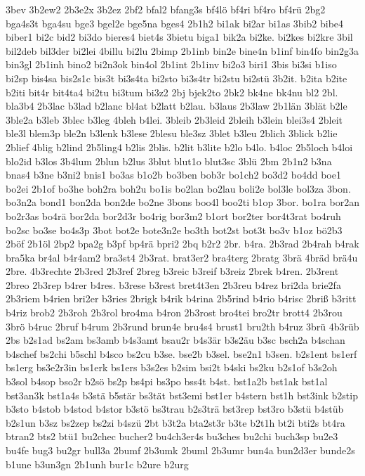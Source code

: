 {3bev
3b2ew2
2b3e2x
3b2ez
2bf2
bfal2
bfang3s
bf4lö
bf4ri
bf4ro
bf4rü
2bg2
bga4s3t
bga4su
bge3
bgel2e
bge5na
bges4
2b1h2
bi1ak
bi2ar
bi1as
3bib2
bibe4
biber1
bi2c
bid2
bi3do
bieres4
biet4s
3bietu
biga1
bik2a
bi2ke.
bi2kes
bi2kre
3bil
bil2deb
bil3der
bi2lei
4billu
bi2lu
2bimp
2b1inb
bin2e
bine4n
b1inf
bin4fo
bin2g3a
bin3gl
2b1inh
bino2
bi2n3ok
bin4ol
2b1int
2b1inv
bi2o3
biri1
3bis
bi3si
b1iso
bi2sp
bis4sa
bis2s1c
bis3t
bi3s4ta
bi2sto
bi3s4tr
bi2stu
bi2stü
3b2it.
b2ita
b2ite
b2iti
bit4r
bit4ta4
bi2tu
bi3tum
bi3z2
2bj
bjek2to
2bk2
bk4ne
bk4nu
bl2
2bl.
bla3b4
2b3lac
b3lad
b2lanc
bl4at
b2latt
b2lau.
b3laus
2b3law
2b1län
3blät
b2le
3ble2a
b3leb
3blec
b3leg
4bleh
b4lei.
3bleib
2b3leid
2bleih
b3lein
blei3s4
2bleit
ble3l
blem3p
ble2n
b3lenk
b3lese
2blesu
ble3sz
3blet
b3leu
2blich
3blick
b2lie
2blief
4blig
b2lind
2b5ling4
b2lis
2blis.
b2lit
b3lite
b2lo
b4lo.
b4loc
2b5loch
b4loi
blo2id
b3los
3b4lum
2blun
b2lus
3blut
blut1o
blut3sc
3blü
2bm
2b1n2
b3na
bnas4
b3ne
b3ni2
bnis1
bo3as
b1o2b
bo3ben
bob3r
bo1ch2
bo3d2
bo4dd
boe1
bo2ei
2b1of
bo3he
boh2ra
boh2u
bo1is
bo2lan
bo2lau
boli2e
bol3le
bol3za
3bon.
bo3n2a
bond1
bon2da
bon2de
bo2ne
3bons
boo4l
boo2ti
b1op
3bor.
bo1ra
bor2an
bo2r3as
bo4rä
bor2da
bor2d3r
bo4rig
bor3m2
b1ort
bor2ter
bor4t3rat
bo4ruh
bo2sc
bo3se
bo4s3p
3bot
bot2e
bote3n2e
bo3th
bot2st
bot3t
bo3v
b1oz
bö2b3
2böf
2b1öl
2bp2
bpa2g
b3pf
bp4rä
bpri2
2bq
b2r2
2br.
b4ra.
2b3rad
2b4rah
b4rak
bra5ka
br4al
b4r4am2
bra3st4
2b3rat.
brat3er2
bra4terg
2bratg
3brä
4bräd
brä4u
2bre.
4b3rechte
2b3red
2b3ref
2breg
b3reic
b3reif
b3reiz
2brek
b4ren.
2b3rent
2breo
2b3rep
b4rer
b4res.
b3rese
b3rest
bret4t3en
2b3reu
b4rez
bri2da
brie2fa
2b3riem
b4rien
bri2er
b3ries
2brigk
b4rik
b4rina
2b5rind
b4rio
b4risc
2briß
b3ritt
b4riz
brob2
2b3roh
2b3rol
bro4ma
b4ron
2b3rost
bro4tei
bro2tr
brott4
2b3rou
3brö
b4ruc
2bruf
b4rum
2b3rund
brun4e
bru4s4
brust1
bru2th
b4ruz
3brü
4b3rüb
2bs
b2s1ad
bs2am
bs3amb
b4s3amt
bsau2r
b4s3är
b3s2äu
b3sc
bsch2a
b4schan
b4schef
bs2chi
b5schl
b4sco
bs2cu
b3se.
bse2b
b3sel.
bse2n1
b3sen.
b2s1ent
bs1erf
bs1erg
bs3e2r3in
bs1erk
bs1ers
b3s2es
b2sim
bsi2t
b4ski
bs2ku
b2s1of
b3s2oh
b3sol
b4sop
bso2r
b2sö
bs2p
bs4pi
bs3po
bss4t
b4st.
bst1a2b
bst1ak
bst1al
bst3an3k
bst1a4s
b3stä
b5stär
bs3tät
bst3emi
bst1er
b4stern
bst1h
bst3ink
b2stip
b3sto
b4stob
b4stod
b4stor
b3stö
bs3trau
b2s3trä
bst3rep
bst3ro
b3stü
b4stüb
b2s1un
b3sz
bs2zep
bs2zi
b4szü
2bt
b3t2a
bta2st3r
b3te
b2t1h
bt2i
bti2s
bt4ra
btran2
bts2
btü1
bu2chec
bucher2
bu4ch3er4s
bu3ches
bu2chi
buch3sp
bu2e3
bu4fe
bug3
bu2gr
bull3a
2bumf
2b3umk
2buml
2b3umr
bun4a
bun2d3er
bunde2s
b1une
b3un3gn
2b1unh
bur1c
b2ure
b2urg
}

